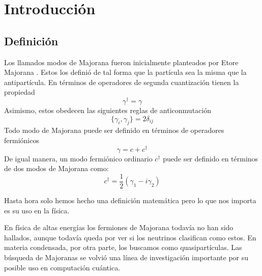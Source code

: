 %
%
\chapter{Introducci\'{o}n}

%
%
\section{Definici\'{o}n}
Los llamados modos de Majorana fueron inicialmente planteados por Etore Majorana \cite{Majorana1937TeoriaSD}. Estos los defini\'{o} de tal forma que la part\'{i}cula sea la misma que la antipart\'{i}cula. En t\'{e}rminos de operadores de segunda cuantizaci\'{o}n tienen la propiedad 
\begin{equation}
    \gamma^\dagger=\gamma
\end{equation}
Asimismo, estos obedecen las siguientes reglas de anticonmutaci\'{o}n
\begin{equation}
    \{\gamma_i,\gamma_j\}=2\delta_{ij}
\end{equation}
Todo modo de Majorana puede ser definido en t\'{e}rminos de operadores fermi\'{o}nicos
\begin{equation}
    \gamma=c+c^\dagger
\end{equation}
De igual manera, un modo fermi\'{o}nico ordinario $c^\dagger$ puede ser definido en t\'{e}rminos de dos modos de Majorana como:
\begin{equation}
    c^\dagger=\frac{1}{2}(\gamma_1-i\gamma_2)
\end{equation}

Hasta hora solo hemos hecho una definici\'{o}n matem\'{a}tica pero lo que nos importa es su uso en la f\'{i}sica.

En f\'{i}sica de altas energ\'{i}as los fermiones de Majorana todav\'{i}a no han sido hallados, aunque todav\'{i}a queda por ver si los neutrinos clasifican como estos. En materia condensada, por otra parte, los buscamos como quasipart\'{i}culas. Las b\'{u}squeda de Majoranas se volvi\'{o} una l\'{i}nea de investigaci\'{o}n importante por su posible uso en computaci\'{o}n cu\'{a}ntica. 

